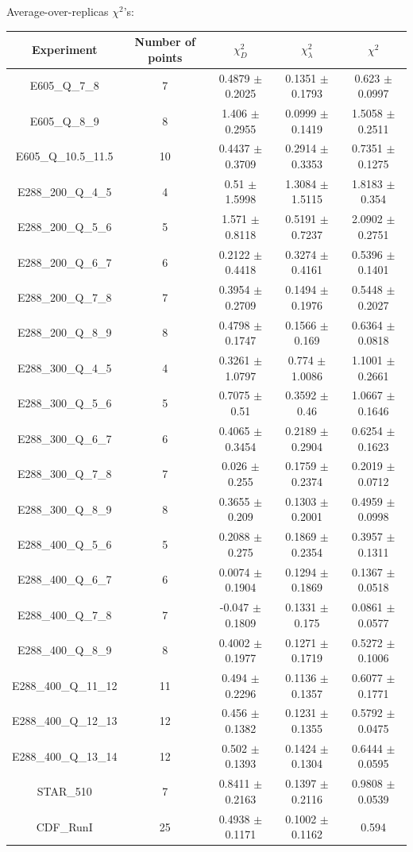 \documentclass[
]{article}
\begin{document}
Average-over-replicas \(\chi^2\)'s:

\begin{longtable}[]{@{}ccccc@{}}
\toprule
Experiment & Number of points & \(\chi_{D}^2\) & \(\chi_{\lambda}^2\) &
\(\chi^2\)\tabularnewline
\midrule
\endhead
E605\_Q\_7\_8 & 7 & 0.4879 \(\pm\) 0.2025 & 0.1351 \(\pm\) 0.1793 &
0.623 \(\pm\) 0.0997\tabularnewline
E605\_Q\_8\_9 & 8 & 1.406 \(\pm\) 0.2955 & 0.0999 \(\pm\) 0.1419 &
1.5058 \(\pm\) 0.2511\tabularnewline
E605\_Q\_10.5\_11.5 & 10 & 0.4437 \(\pm\) 0.3709 & 0.2914 \(\pm\) 0.3353
& 0.7351 \(\pm\) 0.1275\tabularnewline
E288\_200\_Q\_4\_5 & 4 & 0.51 \(\pm\) 1.5998 & 1.3084 \(\pm\) 1.5115 &
1.8183 \(\pm\) 0.354\tabularnewline
E288\_200\_Q\_5\_6 & 5 & 1.571 \(\pm\) 0.8118 & 0.5191 \(\pm\) 0.7237 &
2.0902 \(\pm\) 0.2751\tabularnewline
E288\_200\_Q\_6\_7 & 6 & 0.2122 \(\pm\) 0.4418 & 0.3274 \(\pm\) 0.4161 &
0.5396 \(\pm\) 0.1401\tabularnewline
E288\_200\_Q\_7\_8 & 7 & 0.3954 \(\pm\) 0.2709 & 0.1494 \(\pm\) 0.1976 &
0.5448 \(\pm\) 0.2027\tabularnewline
E288\_200\_Q\_8\_9 & 8 & 0.4798 \(\pm\) 0.1747 & 0.1566 \(\pm\) 0.169 &
0.6364 \(\pm\) 0.0818\tabularnewline
E288\_300\_Q\_4\_5 & 4 & 0.3261 \(\pm\) 1.0797 & 0.774 \(\pm\) 1.0086 &
1.1001 \(\pm\) 0.2661\tabularnewline
E288\_300\_Q\_5\_6 & 5 & 0.7075 \(\pm\) 0.51 & 0.3592 \(\pm\) 0.46 &
1.0667 \(\pm\) 0.1646\tabularnewline
E288\_300\_Q\_6\_7 & 6 & 0.4065 \(\pm\) 0.3454 & 0.2189 \(\pm\) 0.2904 &
0.6254 \(\pm\) 0.1623\tabularnewline
E288\_300\_Q\_7\_8 & 7 & 0.026 \(\pm\) 0.255 & 0.1759 \(\pm\) 0.2374 &
0.2019 \(\pm\) 0.0712\tabularnewline
E288\_300\_Q\_8\_9 & 8 & 0.3655 \(\pm\) 0.209 & 0.1303 \(\pm\) 0.2001 &
0.4959 \(\pm\) 0.0998\tabularnewline
E288\_400\_Q\_5\_6 & 5 & 0.2088 \(\pm\) 0.275 & 0.1869 \(\pm\) 0.2354 &
0.3957 \(\pm\) 0.1311\tabularnewline
E288\_400\_Q\_6\_7 & 6 & 0.0074 \(\pm\) 0.1904 & 0.1294 \(\pm\) 0.1869 &
0.1367 \(\pm\) 0.0518\tabularnewline
E288\_400\_Q\_7\_8 & 7 & -0.047 \(\pm\) 0.1809 & 0.1331 \(\pm\) 0.175 &
0.0861 \(\pm\) 0.0577\tabularnewline
E288\_400\_Q\_8\_9 & 8 & 0.4002 \(\pm\) 0.1977 & 0.1271 \(\pm\) 0.1719 &
0.5272 \(\pm\) 0.1006\tabularnewline
E288\_400\_Q\_11\_12 & 11 & 0.494 \(\pm\) 0.2296 & 0.1136 \(\pm\) 0.1357
& 0.6077 \(\pm\) 0.1771\tabularnewline
E288\_400\_Q\_12\_13 & 12 & 0.456 \(\pm\) 0.1382 & 0.1231 \(\pm\) 0.1355
& 0.5792 \(\pm\) 0.0475\tabularnewline
E288\_400\_Q\_13\_14 & 12 & 0.502 \(\pm\) 0.1393 & 0.1424 \(\pm\) 0.1304
& 0.6444 \(\pm\) 0.0595\tabularnewline
STAR\_510 & 7 & 0.8411 \(\pm\) 0.2163 & 0.1397 \(\pm\) 0.2116 & 0.9808
\(\pm\) 0.0539\tabularnewline
CDF\_RunI & 25 & 0.4938 \(\pm\) 0.1171 & 0.1002 \(\pm\) 0.1162 & 0.594

\end{longtable}
\end{document}
